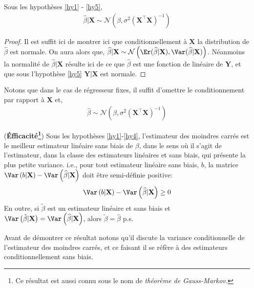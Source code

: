 \begin{proposition}
Sous les hypothèses \ref{hy1} - \ref{hy5},
\begin{align*}
\widehat{\beta} | \mathbf{X} \sim \mathcal{N}\left(\beta, \sigma^2(\mathbf{X}^\top\mathbf{X})^{-1}\right)
\end{align*}
\end{proposition}
\begin{proof}
Il est suffit ici de montrer ici que conditionnellement à $\mathbf{X}$ la distribution de $\widehat{\beta}$ est normale. On aura alors que, $\widehat{\beta} | \mathbf{X}\sim \mathcal{N}\left(\Er(\widehat{\beta}| \mathbf{X}), \Var(\widehat{\beta} | \mathbf{X})\right)$. Néanmoins la normalité de $\widehat{\beta} | \mathbf{X}$ résulte ici de ce que $\widehat{\beta}$ est une fonction de linéaire de $\mathbf{Y}$, et que sous l'hypothèse \ref{hy5} $\mathbf{Y}|\mathbf{X}$ est normale.
\end{proof}
Notons que dans le cas de régresseur fixes, il suffit d'omettre le conditionnement par rapport à $\mathbf{X}$ et,
\begin{align*}
\widehat{\beta}\sim\mathcal{N}\left(\beta, \sigma^2(\mathbf{X}^\top\mathbf{X})^{-1}\right)
\end{align*}
\begin{proposition}(\textbf{\'Efficacité\footnote{Ce résultat est aussi connu sous le nom de \emph{théorème de Gauss-Markov.}}}) Sous les hypothèses \ref{hy1}-\ref{hy4}, l'estimateur des moindres carrés est le meilleur estimateur linéaire sans biais de $\beta$, dans le sens où il s'agit de l'estimateur, dans la classe des estimateurs linéaires et sans biais, qui présente la plus petite variance. i.e., pour tout estimateur linéaire sans biais, $b$, la matrice $\Var\left(b|\mathbf{X}\right)-\Var\left(\widehat{\beta}|\mathbf{X}\right)$ doit être semi-définie positive:
\begin{align*}
\Var\left(b|\mathbf{X}\right)-\Var\left(\widehat{\beta}|\mathbf{X}\right) \geq 0
\end{align*}
En outre, si $\tilde{\beta}$ est un estimateur linéaire et sans biais et 
$\Var\left(\tilde{\beta}|\mathbf{X}\right) = \Var\left(\widehat{\beta}|\mathbf{X}\right)$, alors $\tilde{\beta} = \widehat{\beta}$ p.s.
\end{proposition}
Avant de démontrer ce résultat notons qu'il discute la variance conditionnelle de l'estimateur des moindres carrés, et ce faisant il se réfère à des estimateurs conditionnellement sans biais.
